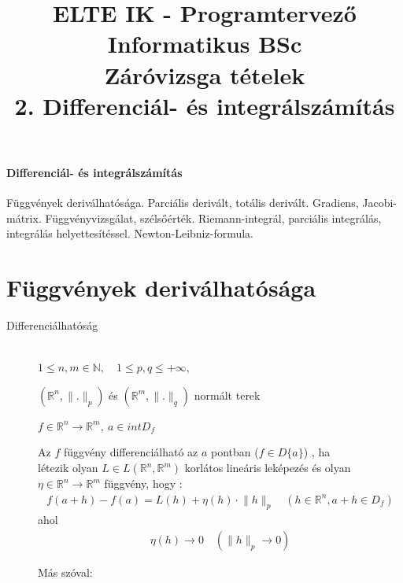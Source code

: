 \documentclass[margin=0px]{article}
\title{\textbf{{\Large ELTE IK - Programtervező Informatikus BSc} \vspace{0.2cm} \\ {\huge Záróvizsga tételek}} \vspace{0.3cm} \\ 2. Differenciál- és integrálszámítás}
\author{}
\date{}
\newenvironment{tetel}[1]{\paragraph{#1 \\}}{}
\newcommand{\R}{\mathbb{R}}
\begin{document}
\maketitle

\begin{tetel}{Differenciál- és integrálszámítás}
    Függvények deriválhatósága. Parciális derivált, totális derivált. Gradiens, Jacobi-mátrix. Függvényvizsgálat, szélsőérték. Riemann-integrál, parciális integrálás, integrálás helyettesítéssel. Newton-Leibniz-formula.
\end{tetel}

\section{Függvények deriválhatósága}
\begin{description}
    \item[Differenciálhatóság] \hfill \\
        $ 1 \leq n, m \in \mathbb{N}, \quad 1 \leq p,q \leq +\infty,$

        $ (\R^n, \lVert . \rVert_p)$ és $ (\R^m, \lVert . \rVert_q)$ normált terek

        $ f \in \R^n \rightarrow \R^m, \ a \in intD_f $

        Az $f$ függvény differenciálható az $a$ pontban ($ f \in D\{a\}$) , ha\\
        létezik olyan $ L \in L(\R^n, \R^m)$ korlátos lineáris leképezés és olyan $ \eta \in \R^n \rightarrow \R^m $ függvény, hogy :
        \begin{align*}
            f(a+h)-f(a) = L(h)+\eta(h)\cdot \lVert h\rVert_p \quad ( h \in \R^n, a+h \in D_f)
        \end{align*}
        ahol
        \begin{align*}
            \eta(h) \longrightarrow 0 \quad (\lVert h\rVert_p \rightarrow 0)
        \end{align*}

        Más szóval:


\end{description}
\end{document}
